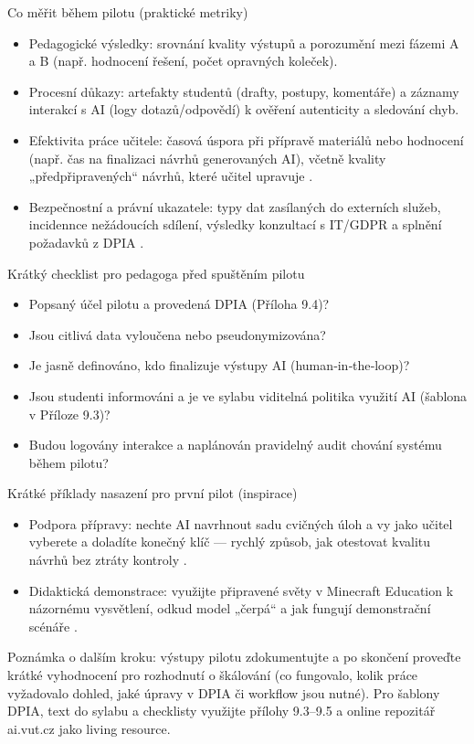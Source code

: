 Co měřit během pilotu (praktické metriky)
\begin{itemize}
  \item Pedagogické výsledky: srovnání kvality výstupů a porozumění mezi fázemi A a B (např. hodnocení řešení, počet opravných koleček).
  \item Procesní důkazy: artefakty studentů (drafty, postupy, komentáře) a záznamy interakcí s AI (logy dotazů/odpovědí) k ověření autenticity a sledování chyb.
  \item Efektivita práce učitele: časová úspora při přípravě materiálů nebo hodnocení (např. čas na finalizaci návrhů generovaných AI), včetně kvality „předpřipravených“ návrhů, které učitel upravuje \cite{kb_ai_101_tipu_pdf_04e4a115_page_8_1}.
  \item Bezpečnostní a právní ukazatele: typy dat zasílaných do externích služeb, incidennce nežádoucích sdílení, výsledky konzultací s IT/GDPR a splnění požadavků z DPIA \cite{kb_malinka_chatgpt_ve_vyuce_dva_roky_pote_2024_pdf_90bc3aaf_page_12_1}.
\end{itemize}

Krátký checklist pro pedagoga před spuštěním pilotu
\begin{itemize}
  \item Popsaný účel pilotu a provedená DPIA (Příloha 9.4)? \cite{kb_malinka_chatgpt_ve_vyuce_dva_roky_pote_2024_pdf_90bc3aaf_page_12_1}
  \item Jsou citlivá data vyloučena nebo pseudonymizována? 
  \item Je jasně definováno, kdo finalizuje výstupy AI (human‑in‑the‑loop)? \cite{kb_ai_101_tipu_pdf_04e4a115_page_8_1}
  \item Jsou studenti informováni a je ve sylabu viditelná politika využití AI (šablona v Příloze 9.3)?
  \item Budou logovány interakce a naplánován pravidelný audit chování systému během pilotu?
\end{itemize}

Krátké příklady nasazení pro první pilot (inspirace)
\begin{itemize}
  \item Podpora přípravy: nechte AI navrhnout sadu cvičných úloh a vy jako učitel vyberete a doladíte konečný klíč — rychlý způsob, jak otestovat kvalitu návrhů bez ztráty kontroly \cite{kb_ai_101_tipu_pdf_04e4a115_page_8_1}.
  \item Didaktická demonstrace: využijte připravené světy v Minecraft Education k názornému vysvětlení, odkud model „čerpá“ a jak fungují demonstrační scénáře \cite{kb_ai_101_tipu_pdf_04e4a115_page_15_2}.
\end{itemize}

Poznámka o dalším kroku: výstupy pilotu zdokumentujte a po skončení proveďte krátké vyhodnocení pro rozhodnutí o škálování (co fungovalo, kolik práce vyžadovalo dohled, jaké úpravy v DPIA či workflow jsou nutné). Pro šablony DPIA, text do sylabu a checklisty využijte přílohy 9.3–9.5 a online repozitář ai.vut.cz jako living resource.